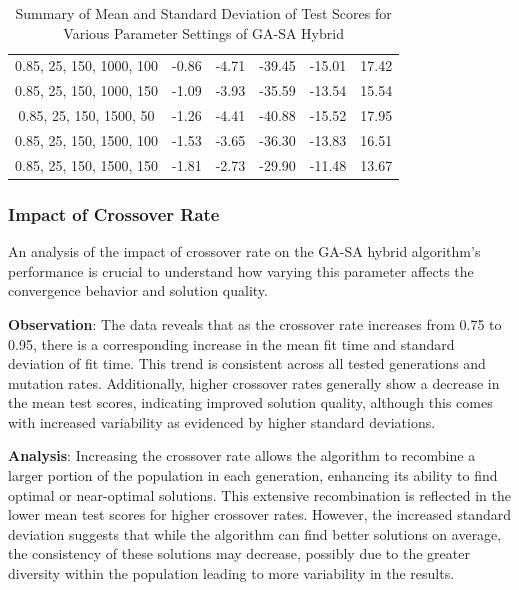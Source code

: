 \documentclass{article}
\begin{document}
\begin{table}[H]
{\begin{tabular}{|c|c|c|c|c|c|}
                0.85, 25, 150, 1000, 100   & -0.86                      & -4.71                      & -39.45                     & -15.01                   & 17.42                   \\
                0.85, 25, 150, 1000, 150   & -1.09                      & -3.93                      & -35.59                     & -13.54                   & 15.54                   \\
                0.85, 25, 150, 1500, 50    & -1.26                      & -4.41                      & -40.88                     & -15.52                   & 17.95                   \\
                0.85, 25, 150, 1500, 100   & -1.53                      & -3.65                      & -36.30                     & -13.83                   & 16.51                   \\
                0.85, 25, 150, 1500, 150   & -1.81                      & -2.73                      & -29.90                     & -11.48                   & 13.67                   \\
                \hline
            \end{tabular}
        }
        \caption{Summary of Mean and Standard Deviation of Test Scores for Various Parameter Settings of GA-SA Hybrid}
        \label{tab:gasa_summary_test_scores}
    \end{table}

    \subsubsection{Impact of Crossover Rate}

    An analysis of the impact of crossover rate on the GA-SA hybrid algorithm’s performance is crucial to understand how varying this parameter affects the convergence behavior and solution quality.

    \textbf{Observation}: The data reveals that as the crossover rate increases from 0.75 to 0.95, there is a corresponding increase in the mean fit time and standard deviation of fit time. This trend is consistent across all tested generations and mutation rates. Additionally, higher crossover rates generally show a decrease in the mean test scores, indicating improved solution quality, although this comes with increased variability as evidenced by higher standard deviations.

    \textbf{Analysis}: Increasing the crossover rate allows the algorithm to recombine a larger portion of the population in each generation, enhancing its ability to find optimal or near-optimal solutions. This extensive recombination is reflected in the lower mean test scores for higher crossover rates. However, the increased standard deviation suggests that while the algorithm can find better solutions on average, the consistency of these solutions may decrease, possibly due to the greater diversity within the population leading to more variability in the results.
\end{document}

